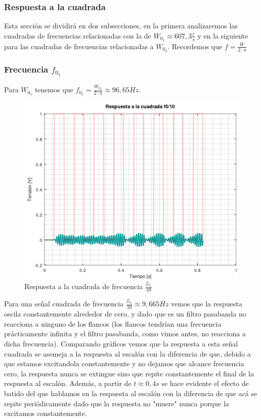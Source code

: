 \documentclass[11pt,a4paper]{report}
\begin{document}
\newpage
\subsubsection*{Respuesta a la cuadrada}

Esta sección se dividirá en dos subsecciones, en la primera analizaremos las cuadradas de frecuencias relacionadas con la de $W_{0_{1}} \approx 607,3 \frac{r}{s}$ y en la siguiente para las cuadradas de frecuencias relacionadas a $W_{0_{2}}$. Recordemos que $f = \frac{W}{2 \cdot \pi}$

\subsubsection*{Frecuencia $f_{0_{1}}$}

Para $W_{0_{1}}$ tenemos que $f_{0_{1}} = \frac{W_{0_{1}}}{2 \cdot \pi} \approx 96,65Hz$.

\begin{figure}[h!]
\includegraphics[scale=1]{RtaCuadradaWo11.png}
\caption{Respuesta a la cuadrada de frecuencia $\frac{f_{0_{1}}}{10}$}
\end{figure}

Para una señal cuadrada de frecuencia $\frac{f_{0_{1}}}{10} \approx 9,665Hz$ vemos que 
la respuesta oscila constantemente alrededor de cero, y dado que es un filtro pasabanda no reacciona a ninguno de los flancos (los flancos tendrían una frecuencia
prácticamente infinita y el filtro pasabanda, como vimos antes, no reacciona a dicha frecuencia). Comparando gráficos vemos que la respuesta a esta señal cuadrada se asemeja a la respuesta al escalón con la diferencia de que, debido a que estamos excitandola constantemente y no dejamos que alcance frecuencia cero, la respuesta nunca se extingue sino que repite constantemente el final de la respuesta al escalón.
Además, a partir de $t \approx 0,4s$ se hace evidente el efecto de batido del que hablamos en la respuesta al escalón con la diferencia de que acá se repite periódicamente dado que la respuesta no "muere" nunca porque la excitamos constantemente.
 
\end{document}
